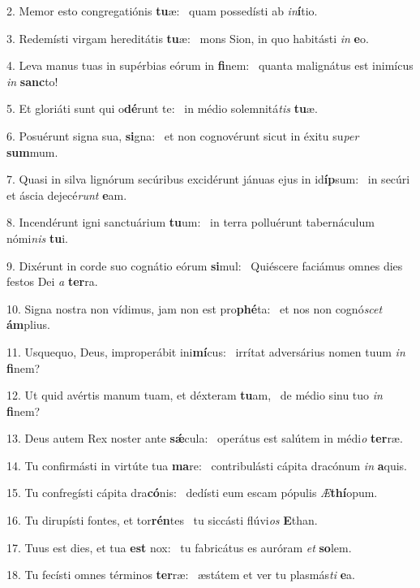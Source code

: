 2. Memor esto congregatiónis \textbf{tu}æ: \ast\  quam possedísti ab \textit{in}\textbf{í}tio.\

3. Redemísti virgam hereditátis \textbf{tu}æ: \ast\  mons Sion, in quo habitásti \textit{in} \textbf{e}o.\

4. Leva manus tuas in supérbias eórum in \textbf{fi}nem: \ast\  quanta malignátus est inimícus \textit{in} \textbf{sanc}to!\

5. Et gloriáti sunt qui o\textbf{dé}runt te: \ast\  in médio solemnitá\textit{tis} \textbf{tu}æ.\

6. Posuérunt signa sua, \textbf{si}gna: \ast\  et non cognovérunt sicut in éxitu su\textit{per} \textbf{sum}mum.\

7. Quasi in silva lignórum secúribus excidérunt jánuas ejus in id\textbf{íp}sum: \ast\  in secúri et áscia dejecé\textit{runt} \textbf{e}am.\

8. Incendérunt igni sanctuárium \textbf{tu}um: \ast\  in terra polluérunt tabernáculum nómi\textit{nis} \textbf{tu}i.\

9. Dixérunt in corde suo cognátio eórum \textbf{si}mul: \ast\  Quiéscere faciámus omnes dies festos Dei \textit{a} \textbf{ter}ra.\

10. Signa nostra non vídimus, jam non est pro\textbf{phé}ta: \ast\  et nos non cognó\textit{scet} \textbf{ám}plius.\

11. Usquequo, Deus, improperábit ini\textbf{mí}cus: \ast\  irrítat adversárius nomen tuum \textit{in} \textbf{fi}nem?\

12. Ut quid avértis manum tuam, et déxteram \textbf{tu}am, \ast\  de médio sinu tuo \textit{in} \textbf{fi}nem?\

13. Deus autem Rex noster ante \textbf{sǽ}cula: \ast\  operátus est salútem in médi\textit{o} \textbf{ter}ræ.\

14. Tu confirmásti in virtúte tua \textbf{ma}re: \ast\  contribulásti cápita dracónum \textit{in} \textbf{a}quis.\

15. Tu confregísti cápita dra\textbf{có}nis: \ast\  dedísti eum escam pópulis \textit{Æ}\textbf{thí}opum.\

16. Tu dirupísti fontes, et tor\textbf{rén}tes \ast\  tu siccásti flúvi\textit{os} \textbf{E}than.\

17. Tuus est dies, et tua \textbf{est} nox: \ast\  tu fabricátus es auróram \textit{et} \textbf{so}lem.\

18. Tu fecísti omnes términos \textbf{ter}ræ: \ast\  æstátem et ver tu plasmás\textit{ti} \textbf{e}a.\

